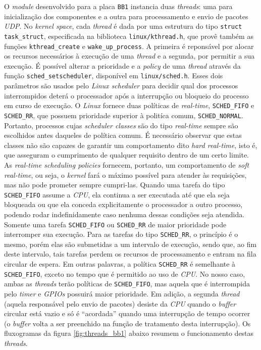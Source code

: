 O \textit{module} desenvolvido para a placa \texttt{BB1} instancia duas
\textit{threads}: uma para inicialização dos componentes e a outra para
processamento e envio de pacotes \textit{UDP}. No \textit{kernel space}, cada
\textit{thread} é dada por uma estrutura do tipo \texttt{struct task\_struct},
especificada na biblioteca \texttt{linux/kthread.h}, que provê também as funções
\texttt{kthread\_create} e \texttt{wake\_up\_process}. A primeira é reponsável
por alocar os recursos necessários à execução de uma \textit{thread} e a
segunda, por permitir a sua execução. É possível alterar a prioridade e a
\textit{policy} de uma \textit{thread} através da função
\texttt{sched\_setscheduler}, disponível em \texttt{linux/sched.h}. Esses dois
parâmetros são usados pelo \textit{Linux scheduler} para decidir qual dos
processos interrompidos deterá o processador após a interrupção ou bloqueio do
processo em curso de execução. O \textit{Linux} fornece duas políticas de
\textit{real-time}, \texttt{SCHED\_FIFO} e \texttt{SCHED\_RR}, que possuem
prioridade superior à politíca comum, \texttt{SCHED\_NORMAL}. Portanto,
processos cujas \textit{scheduler classes} são do tipo \textit{real-time} sempre
são escolhidos antes daqueles de política comum. É necessário observar que estas
classes não são capazes de garantir um comportamento dito \textit{hard
real-time}, isto é, que asseguram o cumprimento de qualquer requisito dentro de
um certo limite. As \textit{real-time scheduling policies} fornecem, portanto,
um comportamento de \textit{soft real-time}, ou seja, o \textit{kernel} fará o
máximo possível para atender às requisições, mas não pode prometer sempre
cumpri-las. Quando uma tarefa do tipo \texttt{SCHED\_FIFO} assume a
\textit{CPU}, ela continua a ser executada até que ela seja bloqueada ou que ela conceda
explicitamente o processador a outro processo, podendo rodar indefinidamente
caso nenhuma dessas condições seja atendida. Somente uma tarefa
\texttt{SCHED\_FIFO} ou \texttt{SCHED\_RR} de maior prioridade pode interromper
sua execução. Para as tarefas do tipo \texttt{SCHED\_RR}, o princípio é o mesmo,
porém elas são submetidas a um intervalo de execução, sendo que, ao fim deste
intervalo, tais tarefas perdem os recursos de processamento e entram na fila
circular de espera. Em outras palavras, a política \texttt{SCHED\_RR} é
semelhante à \texttt{SCHED\_FIFO}, exceto no tempo que é permitido ao uso de
\textit{CPU}. No nosso caso, ambas as \textit{threads} terão políticas de
\texttt{SCHED\_FIFO}, mas aquela que é interrompida pelo \textit{timer} e
\textit{GPIOs} possuirá maior prioridade. Em adição, a segunda \textit{thread}
(aquela responsável pelo envio de pacotes) desiste da \textit{CPU} quando o
\textit{buffer} circular está vazio e só é ``acordada'' quando uma interrupção
de tempo ocorrer (o \textit{buffer} volta a ser preenchido na função de
tratamento desta interrupção). Os fluxogramas da figura \ref{fig:threads_bb1}
abaixo resumem o funcionamento destas \textit{threads}.

